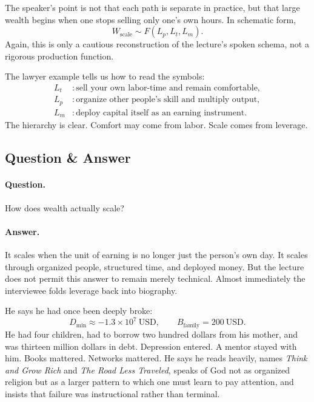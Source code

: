 The speaker's point is not that each path is separate in practice, but that large wealth begins when one stops selling only one's own hours. In schematic form,
\begin{equation}
W_{\text{scale}} \sim F(L_p,L_t,L_m).
\end{equation}
Again, this is only a cautious reconstruction of the lecture's spoken schema, not a rigorous production function.

The lawyer example tells us how to read the symbols:
\begin{align}
L_t &: \text{sell your own labor-time and remain comfortable},\\
L_p &: \text{organize other people's skill and multiply output},\\
L_m &: \text{deploy capital itself as an earning instrument}.
\end{align}
The hierarchy is clear. Comfort may come from labor. Scale comes from leverage.

\subsection{Question \& Answer}

\paragraph{Question.} How does wealth actually scale?

\paragraph{Answer.} It scales when the unit of earning is no longer just the person's own day. It scales through organized people, structured time, and deployed money. But the lecture does not permit this answer to remain merely technical. Almost immediately the interviewee folds leverage back into biography.

He says he had once been deeply broke:
\begin{equation}
D_{\min} \approx -1.3 \times 10^{7}\ \mathrm{USD},
\qquad
B_{\text{family}} = 200\ \mathrm{USD}.
\end{equation}
He had four children, had to borrow two hundred dollars from his mother, and was thirteen million dollars in debt. Depression entered. A mentor stayed with him. Books mattered. Networks mattered. He says he reads heavily, names \emph{Think and Grow Rich} and \emph{The Road Less Traveled}, speaks of God not as organized religion but as a larger pattern to which one must learn to pay attention, and insists that failure was instructional rather than terminal.

